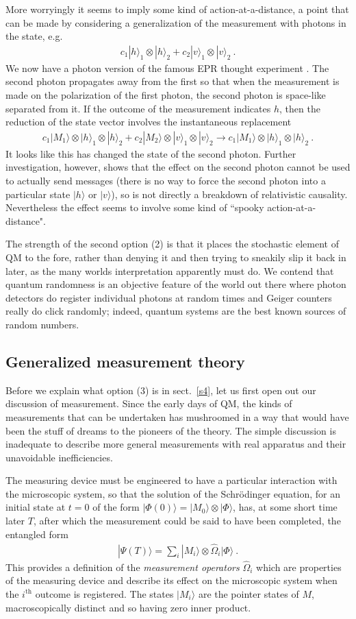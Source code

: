 \documentclass[12pt]{article}
\theoremstyle{plain}
\theoremstyle{definition}
\theoremstyle{remark}
\def\ket#1{| #1\rangle}
\newcommand{\EQ}[1]{\begin{equation}\begin{split} #1
\end{split}\end{equation}}
\begin{document}
More worryingly it seems to imply some kind of action-at-a-distance, a point that can be made by considering a generalization of the measurement with photons in the state, e.g.
\EQ{
c_1\ket{h}_1\otimes\ket{h}_2+c_2\ket{v}_1\otimes\ket{v}_2\ .
}
We now have a photon version of the famous EPR thought experiment \cite{EinsteinPodolskyRosen:1935cqmdprbcc}.
The second photon propagates away from the first so that when the measurement is made on the polarization of the first photon, the second photon is space-like separated from it. If the outcome of the measurement indicates $h$, then the reduction of the state vector involves the instantaneous replacement
\EQ{
c_1\ket{M_1}\otimes\ket{h}_1\otimes\ket{h}_2+c_2\ket{M_2}\otimes\ket{v}_1\otimes\ket{v}_2
\longrightarrow c_1\ket{M_1}\otimes\ket{h}_1\otimes\ket{h}_2\ .
}
It looks like this has changed the state of the second photon. Further investigation, however, shows that the effect on the second photon cannot be used to actually send messages (there is no way to force the second photon into a particular state $\ket{h}$ or $\ket{v}$), so is not directly a breakdown of relativistic causality. Nevertheless the effect seems to involve some kind of ``spooky action-at-a-distance".

The strength of the second option (2) is that it places the stochastic element of QM to the fore, rather than denying it and then trying to sneakily slip it back in later, as the many worlds interpretation apparently must do.
We contend that quantum randomness is an objective feature of the world out there where photon detectors do 
register individual photons at random times and Geiger counters really do click randomly; indeed, quantum systems are the best known sources of random numbers. 

\subsection{Generalized measurement theory}\label{s2.1}

Before we explain what option (3) is in sect.~\ref{s4}, let us first open out our discussion of measurement.
Since the early days of QM, the kinds of measurements that can be undertaken has mushroomed in a way that would have been the stuff of dreams to the pioneers of the theory. 
The simple discussion is inadequate to describe more general measurements with real
apparatus and their unavoidable inefficiencies.

The measuring device must be engineered to have a particular interaction with the microscopic system, so that the solution of the Schr\"odinger equation, for an initial state at $t=0$ of the form $\ket{\Phi(0)}=\ket{M_0}\otimes\ket{\Phi}$, has, at some short time later $T$, after which the measurement could be said to have been completed, the entangled form
\EQ{
\ket{\Psi(T)}=\sum_i\ket{M_i}\otimes\hat \Omega_i\ket{\Phi}\ .
\label{fin}
}
This provides a definition of the {\it measurement operators\/} $\hat \Omega_i$ which 
are properties of the measuring device and describe its effect on the microscopic system when the $i^\text{th}$ outcome 
is registered. The states $\ket{M_i}$ are the pointer states of $M$, macroscopically distinct and so having zero inner product.
\end{document}
